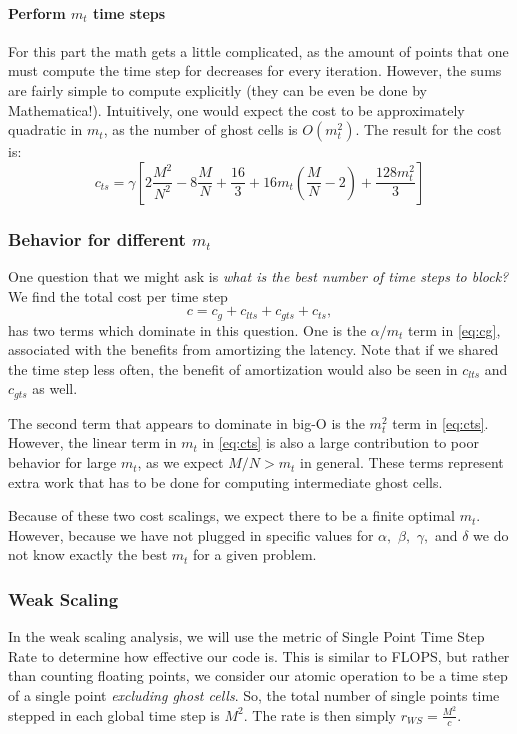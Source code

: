 \documentclass{article}
\begin{document}
\paragraph{Perform $m_t$ time steps} For this part the math gets a little complicated, as the amount of points that one must compute the time step for decreases for every iteration. However, the sums are fairly simple to compute explicitly (they can be even be done by Mathematica!). Intuitively, one would expect the cost to be approximately quadratic in $m_t$, as the number of ghost cells is $O(m_t^2)$. The result for the cost is:
\begin{equation}
\label{eq:cts}
    c_{ts} = \gamma \left[ 2 \frac{M^2}{N^2}-8 \frac{M}{N} + \frac{16}{3} +16  m_t\left(\frac{M}{N} - 2\right) + \frac{128  m_t^2}{3}\right]
\end{equation}

\subsubsection{Behavior for different $m_t$}
One question that we might ask is \textit{what is the best number of time steps to block?} We find the total cost per time step 
\begin{equation*}
    c = c_g + c_{lts} + c_{gts} + c_{ts},
\end{equation*}
has two terms which dominate in this question. One is the $\alpha/m_t$ term in \eqref{eq:cg}, associated with the benefits from amortizing the latency. Note that if we shared the time step less often, the benefit of amortization would also be seen in $c_{lts}$ and $c_{gts}$ as well.

The second term that appears to dominate in big-O is the $m_t^2$ term in \eqref{eq:cts}. However, the linear term in $m_t$ in \eqref{eq:cts} is also a large contribution to poor behavior for large $m_t$, as we expect $M/N>m_t$ in general. These terms represent extra work that has to be done for computing intermediate ghost cells.

Because of these two cost scalings, we expect there to be a finite optimal $m_t$. However, because we have not plugged in specific values for $\alpha,$  $\beta,$  $\gamma,$ and $\delta$ we do not know exactly the best $m_t$ for a given problem.

\subsubsection{Weak Scaling}
In the weak scaling analysis, we will use the metric of Single Point Time Step Rate to determine how effective our code is. This is similar to FLOPS, but rather than counting floating points, we consider our atomic operation to be a time step of a single point \textit{excluding ghost cells}. So, the total number of single points time stepped in each global time step is $M^2$. The rate is then simply $r_{WS} = \frac{M^2}{c}$.
\end{document}
